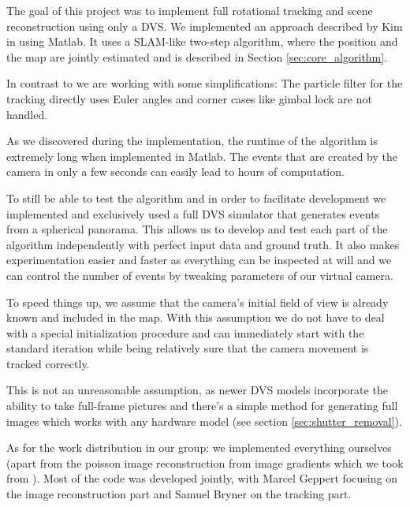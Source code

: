 The goal of this project was to implement full rotational tracking and scene
reconstruction using only a DVS. We implemented an approach described by Kim \etal
in \cite{kim2014simultaneous} using Matlab. It uses a SLAM-like two-step
algorithm, where the position and the map are jointly estimated and is
described in Section \ref{sec:core_algorithm}.

In contrast to \cite{kim2014simultaneous} we are working with some
simplifications: The particle filter for the tracking directly uses Euler
angles and corner cases like gimbal lock are not handled.

As we discovered during the implementation, the runtime of the algorithm is
extremely long when implemented in Matlab. The events that are created by the
camera in only a few seconds can easily lead to hours of computation.

To still be able to test the algorithm and in order to facilitate development
we implemented and exclusively used a full DVS simulator that generates events
from a spherical panorama.  This allows us to develop and test each part of the
algorithm independently with perfect input data and ground truth. It also makes
experimentation easier and faster as everything can be inspected at will and we can
control the number of events by tweaking parameters of our virtual camera.

To speed things up, we assume that the camera's initial field
of view is already known and included in the map. With this assumption we do
not have to deal with a special initialization procedure and can immediately
start with the standard iteration while being relatively sure that the camera
movement is tracked correctly.

This is not an unreasonable assumption, as newer DVS models incorporate the
ability to take full-frame pictures and there's a simple method for generating
full images which works with any hardware model (see section
\ref{sec:shutter_removal}).

As for the work distribution in our group: we implemented everything ourselves
(apart from the poisson image reconstruction from image gradients which we took
from \cite{raskarpoisson}). Most of the code was developed jointly, with Marcel
Geppert focusing on the image reconstruction part and Samuel Bryner on the
tracking part.
